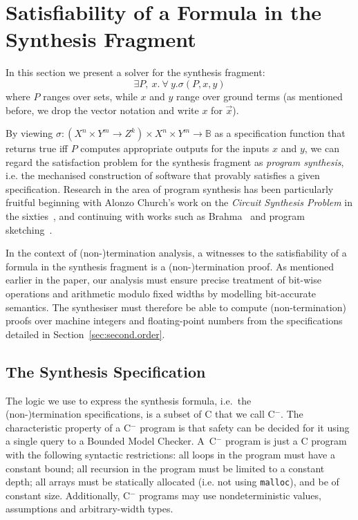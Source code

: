 \documentclass[preprint]{sigplanconf}
\theoremstyle{definition}
\newcommand{\newC}{C$^-$\xspace}
\begin{document}


\section{Satisfiability of a Formula in the Synthesis Fragment} \label{sec:synthesis}


In this section we present a solver for the synthesis fragment:
 \[
  \exists P,~ x . ~\forall~ y . \sigma(P, x, y)
 \]
%
where $P$ ranges over sets, while $x$ and $y$ range over ground terms (as
mentioned before, we drop the vector notation and write $x$ for $\vec{x}$).

By viewing $\sigma: (X^n \times Y^m \to Z^k) \times X^n \times Y^m  \to
\mathbb{B}$ as a specification function that returns true iff $P$ computes
appropriate outputs for the inputs $x$ and $y$, we can regard the
satisfaction problem for the synthesis fragment as \emph{program synthesis},
i.e.  the mechanised construction of software that provably satisfies a
given specification.  Research in the area of program synthesis has been
particularly fruitful beginning with Alonzo Church's work on the
\emph{Circuit Synthesis Problem} in the sixties~\cite{church-synth}, and
continuing with works such as {\sc Brahma}~\cite{brahma} and program
sketching~\cite{lezama-thesis,sketch,modular-sketch}.




In the context of (non-)termination analysis, a witnesses to the
satisfiability of a formula in the synthesis fragment is a
\mbox{(non-)termination} proof.  As mentioned earlier in the paper, our
analysis must ensure precise treatment of bit-wise operations and arithmetic
modulo fixed widths by modelling bit-accurate semantics.  The synthesiser
must therefore be able to compute (non-termination) proofs over machine
integers and floating-point numbers from the specifications detailed in
Section~\ref{sec:second.order}.


\subsection{The Synthesis Specification}

The logic we use to express the synthesis formula, i.e.~the\\
\mbox{(non-)termination} specifications, is a subset of C that we call
\newC.  The characteristic property of a \newC program is that safety can be
decided for it using a single query to a Bounded Model Checker.  A~\newC
program is just a C program with the following syntactic restrictions:
 all loops in the program must have a constant bound;
 all recursion in the program must be limited to a constant depth;
 all arrays must be statically allocated (i.e. not using \texttt{malloc}),
 and be of constant size.
Additionally, \newC programs may use nondeterministic values, assumptions
and arbitrary-width types.
\end{document}
